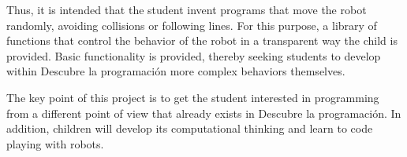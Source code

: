 Thus, it is intended that the student invent programs that move the robot randomly, avoiding collisions or following lines. For this purpose, a library of functions that control the behavior of the robot in a transparent way the child is provided. Basic functionality is provided, thereby seeking students to develop within Descubre la programación more complex behaviors themselves.

The key point of this project is to get the student interested in programming from a different point of view that already exists in Descubre la programación. In addition, children will develop its computational thinking and learn to code playing with robots.


